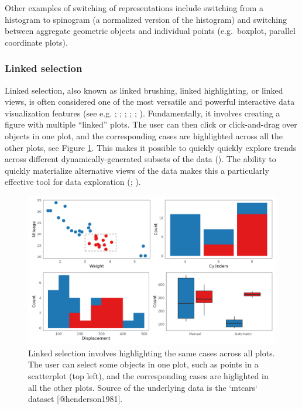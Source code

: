 \documentclass[
]{book}
\begin{document}
Other examples of switching of representations include switching from a histogram to spinogram (a normalized version of the histogram) and switching between aggregate geometric objects and individual points (e.g.~boxplot, parallel coordinate plots).

\subsubsection{Linked selection}\label{linked-selection}

Linked selection, also known as linked brushing, linked highlighting, or linked views, is often considered one of the most versatile and powerful interactive data visualization features (see e.g. ; ; ; ; ; ). Fundamentally, it involves creating a figure with multiple ``linked'' plots. The user can then click or click-and-drag over objects in one plot, and the corresponding cases are highlighted across all the other plots, see Figure \ref{fig:linked-selection}. This makes it possible to quickly quickly explore trends across different dynamically-generated subsets of the data (). The ability to quickly materialize alternative views of the data makes this a particularly effective tool for data exploration (; ).

\begin{figure}

{\centering \includegraphics[width=20.83in]{./figures/linked-selection} 

}

\caption{Linked selection involves highlighting the same cases across all plots. The user can select some objects in one plot, such as points in a scatterplot (top left), and the corresponding cases are higlighted in all the other plots. Source of the underlying data is the `mtcars` dataset [@henderson1981].}\label{fig:linked-selection}
\end{figure}
\end{document}
